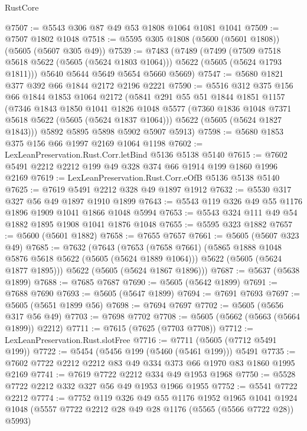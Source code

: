 \begin{lexlean}{RustCore}
\begin{coremodule}
@7507 := @5543 @306 @87 @49 @53 @1808 @1064 @1081 @1041
@7509 := @7507 @1802 @1048
@7518 := @5595 @305 @1808 (@5600 (@5601 @1808)) (@5605 (@5607 @305 @49))
@7539 := @7483
    (@7489
      (@7499
        (@7509 @7518 @5618 @5622 (@5605 (@5624 @1803 @1064)))
        @5622
        (@5605 (@5624 @1793 @1811)))
      @5640
      @5644
      @5649
      @5654
      @5660
      @5669)
@7547 := @5680 @1821 @377 @392 @66 @1844 @2172 @2196 @2221
@7590 := @5516
    @312
    @375
    @156
    @66
    @1844
    @1853
    @1064
    @2172
    (@5841
      @291
      @55
      @51
      @1844
      @1851
      @1157
      (@7346
        @1843
        @1850
        @1041
        @1826
        @1048
        @5577
        (@7360 @1836 @1048 @7371 @5618 @5622 (@5605 (@5624 @1837 @1064)))
        @5622
        (@5605 (@5624 @1827 @1843)))
      @5892
      @5895
      @5898
      @5902
      @5907
      @5913)
@7598 := @5680 @1853 @375 @156 @66 @1997 @2169 @1064 @1198
@7602 := LexLeanPreservation.Rust.Corr.letBind @5136 @5138 @5140
@7615 := @7602 @5491 @2212 @2212 @199 @49 @328 @374 @66 @1914 @199 @1860 @1996 @2169
@7619 := LexLeanPreservation.Rust.Corr.eOfB @5136 @5138 @5140
@7625 := @7619 @5491 @2212 @328 @49 @1897 @1912
@7632 := @5530 @317 @327 @56 @49 @1897 @1910 @1899
@7643 := @5543 @119 @326 @49 @55 @1176 @1896 @1909 @1041 @1866 @1048 @5994
@7653 := @5543 @324 @111 @49 @54 @1882 @1895 @1908 @1041 @1876 @1048
@7655 := @5595 @323 @1882
@7657 := @5600 (@5601 @1882)
@7658 := @7655 @7657
@7661 := @5605 (@5607 @323 @49)
@7685 := @7632
    (@7643
      (@7653
        (@7658 @7661)
        (@5865 @1888 @1048 @5876 @5618 @5622 (@5605 (@5624 @1889 @1064)))
        @5622
        (@5605 (@5624 @1877 @1895)))
      @5622
      (@5605 (@5624 @1867 @1896)))
@7687 := @5637 (@5638 @1899)
@7688 := @7685 @7687
@7690 := @5605 (@5642 @1899)
@7691 := @7688 @7690
@7693 := @5605 (@5647 @1899)
@7694 := @7691 @7693
@7697 := @5605 (@5651 @1899 @56)
@7698 := @7694 @7697
@7702 := @5605 (@5656 @317 @56 @49)
@7703 := @7698 @7702
@7708 := @5605 (@5662 (@5663 (@5664 @1899)) @2212)
@7711 := @7615 (@7625 (@7703 @7708))
@7712 := LexLeanPreservation.Rust.slotFree
@7716 := @7711 (@5605 (@7712 @5491 @199))
@7722 := @5454 (@5456 @199 (@5460 (@5461 @199))) @5491
@7735 := @7602 @7722 @2212 @2212 @83 @49 @334 @373 @66 @1970 @83 @1860 @1995 @2169
@7741 := @7619 @7722 @2212 @334 @49 @1953 @1968
@7750 := @5528 @7722 @2212 @332 @327 @56 @49 @1953 @1966 @1955
@7752 := @5541 @7722 @2212
@7774 := @7752
    @119
    @326
    @49
    @55
    @1176
    @1952
    @1965
    @1041
    @1924
    @1048
    (@5557 @7722 @2212 @28 @49 @28 @1176 (@5565 (@5566 @7722 @28)) @5993)

\end{coremodule}
\end{lexlean}
